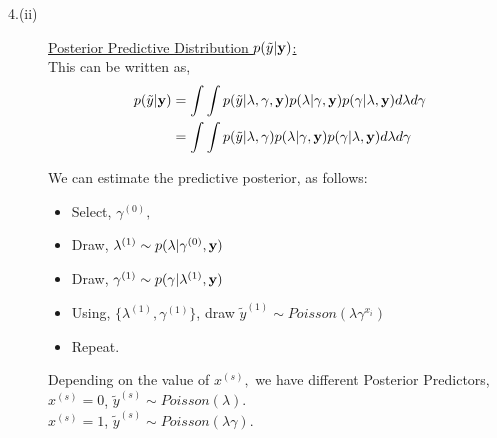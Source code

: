 \documentclass{article}
\begin{document}
\begin{description}
\item[4.(ii)] \underline{Posterior Predictive Distribution $p(\tilde{y}|\bold{y})$:}\\
This can be written as,
\begin{align*}
p(\tilde{y}|\bold{y}) &= \int{\int{p(\tilde{y}|\lambda,\gamma,\bold{y})p(\lambda|\gamma,\bold{y})p(\gamma|\lambda,\bold{y})d\lambda d\gamma}}\\
&= \int{\int{p(\tilde{y}|\lambda,\gamma)p(\lambda|\gamma,\bold{y})p(\gamma|\lambda,\bold{y})d\lambda d\gamma}}\\
\end{align*}

We can estimate the predictive posterior, as follows:\\
\begin{itemize}
\item Select, $\gamma^{(0)},$
\item Draw, $\lambda^{(1)} \sim p(\lambda|\gamma^{(0)},\bold{y})$
\item Draw, $\gamma^{(1)} \sim p(\gamma|\lambda^{(1)},\bold{y})$
\item Using, $\{\lambda^{(1)},\gamma^{(1)}\}$, draw $\tilde{y}^{(1)} \sim Poisson(\lambda\gamma^{x_i})$
\item Repeat.\\
\end{itemize}

\noindent Depending on the value of $x^{(s)},$ we have different Posterior Predictors,\\
$x^{(s)}=0$, $\tilde{y}^{(s)} \sim Poisson(\lambda).$\\
$x^{(s)}=1$, $\tilde{y}^{(s)} \sim Poisson(\lambda\gamma).$\\

\pagebreak


\end{description}
\end{document}
